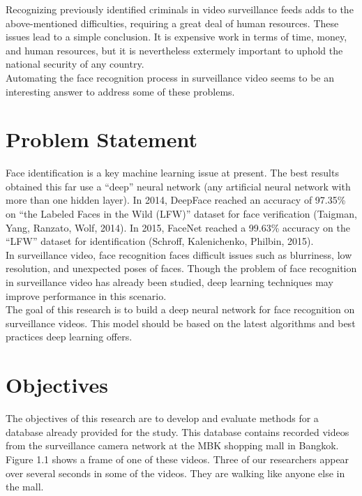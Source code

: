 Recognizing previously identified criminals in video surveillance feeds adds to the above-mentioned difficulties, requiring a great deal of human resources. These issues lead to a simple conclusion.  It is expensive work in terms of time, money, and human resources, but it is nevertheless extermely important to uphold the national security of any country.\\

Automating the face recognition process in surveillance video seems to be an interesting answer to address some of these problems.\\


\section{Problem Statement}

 Face identification is a key machine learning issue at present. The best results obtained this far use a \enquote{deep} neural network (any artificial neural network with more than one hidden layer). In 2014, DeepFace reached an accuracy of 97.35\% on \enquote{the Labeled Faces in the Wild (LFW)} dataset for face verification (Taigman, Yang, Ranzato, Wolf, 2014). In 2015, FaceNet reached a 99.63\% accuracy on the \enquote{LFW} dataset for identification (Schroff, Kalenichenko, Philbin, 2015).\\


In surveillance video, face recognition faces difficult issues such as blurriness, low resolution, and unexpected poses of faces. Though the problem of face recognition in surveillance video has already been studied, deep learning techniques may improve performance in this scenario.\\

The goal of this research is to build a deep neural network for face recognition on surveillance videos. This model should be based on the latest algorithms and best practices deep learning offers.

\section{Objectives}

The objectives of this research are to develop and evaluate methods for a database already provided for the study. This database contains recorded videos from the surveillance camera network at the MBK shopping mall in Bangkok. Figure 1.1 shows a frame of one of these videos. Three of our researchers appear over several seconds in some of the videos. They are walking like anyone else in the mall.\\

